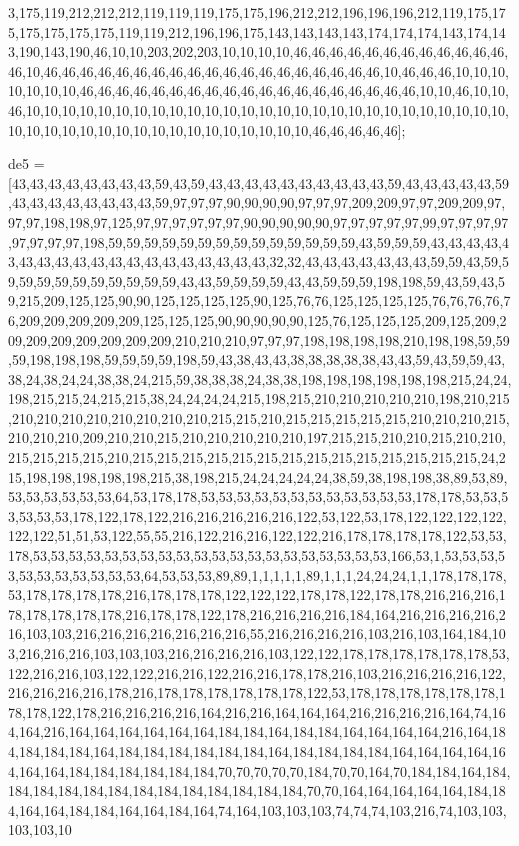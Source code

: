 3,175,119,212,212,212,119,119,119,175,175,196,212,212,196,196,196,212,119,175,175,175,175,175,175,119,119,212,196,196,175,143,143,143,143,174,174,174,143,174,143,190,143,190,46,10,10,203,202,203,10,10,10,10,46,46,46,46,46,46,46,46,46,46,46,46,46,10,46,46,46,46,46,46,46,46,46,46,46,46,46,46,46,46,46,46,46,10,46,46,46,10,10,10,10,10,10,10,46,46,46,46,46,46,46,46,46,46,46,46,46,46,46,46,46,46,46,10,10,46,10,10,46,10,10,10,10,10,10,10,10,10,10,10,10,10,10,10,10,10,10,10,10,10,10,10,10,10,10,10,10,10,10,10,10,10,10,10,10,10,10,10,10,10,10,10,10,46,46,46,46,46];

de5 = [43,43,43,43,43,43,43,43,59,43,59,43,43,43,43,43,43,43,43,43,43,59,43,43,43,43,43,59,43,43,43,43,43,43,43,43,59,97,97,97,90,90,90,90,97,97,97,209,209,97,97,209,209,97,97,97,198,198,97,125,97,97,97,97,97,97,90,90,90,90,90,97,97,97,97,97,99,97,97,97,97,97,97,97,97,198,59,59,59,59,59,59,59,59,59,59,59,59,59,59,43,59,59,59,43,43,43,43,43,43,43,43,43,43,43,43,43,43,43,43,43,43,43,32,32,43,43,43,43,43,43,43,59,59,43,59,59,59,59,59,59,59,59,59,59,59,43,43,59,59,59,59,43,43,59,59,59,198,198,59,43,59,43,59,215,209,125,125,90,90,125,125,125,125,90,125,76,76,125,125,125,125,76,76,76,76,76,209,209,209,209,209,125,125,125,90,90,90,90,90,125,76,125,125,125,209,125,209,209,209,209,209,209,209,209,210,210,210,97,97,97,198,198,198,198,210,198,198,59,59,59,198,198,198,59,59,59,59,198,59,43,38,43,43,38,38,38,38,38,43,43,59,43,59,59,43,38,24,38,24,24,38,38,24,215,59,38,38,38,24,38,38,198,198,198,198,198,198,215,24,24,198,215,215,24,215,215,38,24,24,24,24,215,198,215,210,210,210,210,210,198,210,215,210,210,210,210,210,210,210,210,215,215,210,215,215,215,215,215,210,210,210,215,210,210,210,209,210,210,215,210,210,210,210,210,197,215,215,210,210,215,210,210,215,215,215,215,210,215,215,215,215,215,215,215,215,215,215,215,215,215,215,24,215,198,198,198,198,198,215,38,198,215,24,24,24,24,24,38,59,38,198,198,38,89,53,89,53,53,53,53,53,53,64,53,178,178,53,53,53,53,53,53,53,53,53,53,53,53,178,178,53,53,53,53,53,53,178,122,178,122,216,216,216,216,216,122,53,122,53,178,122,122,122,122,122,122,51,51,53,122,55,55,216,122,216,216,122,122,216,178,178,178,178,122,53,53,178,53,53,53,53,53,53,53,53,53,53,53,53,53,53,53,53,53,53,53,53,166,53,1,53,53,53,53,53,53,53,53,53,53,53,64,53,53,53,89,89,1,1,1,1,1,89,1,1,1,24,24,24,1,1,178,178,178,53,178,178,178,178,216,178,178,178,122,122,122,178,178,122,178,178,216,216,216,178,178,178,178,178,216,178,178,122,178,216,216,216,216,184,164,216,216,216,216,216,103,103,216,216,216,216,216,216,216,55,216,216,216,216,103,216,103,164,184,103,216,216,216,103,103,103,216,216,216,216,103,122,122,178,178,178,178,178,178,53,122,216,216,103,122,122,216,216,122,216,216,178,178,216,103,216,216,216,216,122,216,216,216,216,178,216,178,178,178,178,178,178,122,53,178,178,178,178,178,178,178,178,122,178,216,216,216,216,164,216,216,164,164,164,216,216,216,216,164,74,164,164,216,164,164,164,164,164,164,184,184,164,184,184,164,164,164,164,216,164,184,184,184,184,164,184,184,184,184,184,184,164,184,184,184,184,164,164,164,164,164,164,164,184,184,184,184,184,184,70,70,70,70,70,184,70,70,164,70,184,184,164,184,184,184,184,184,184,184,184,184,184,184,184,184,70,70,164,164,164,164,164,184,184,164,164,184,184,164,164,184,164,74,164,103,103,103,74,74,74,103,216,74,103,103,103,103,10